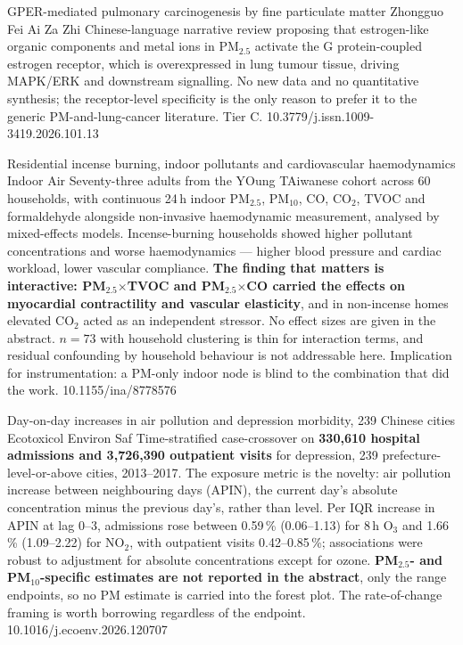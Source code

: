 \documentclass[10pt]{article}
\begin{document}
{GPER-mediated pulmonary carcinogenesis by fine particulate matter}
{Zhongguo Fei Ai Za Zhi}
{Chinese-language narrative review proposing that estrogen-like organic components and
metal ions in PM$_{2.5}$ activate the G protein-coupled estrogen receptor, which is
overexpressed in lung tumour tissue, driving MAPK/ERK and downstream signalling. No new
data and no quantitative synthesis; the receptor-level specificity is the only reason
to prefer it to the generic PM-and-lung-cancer literature. Tier C.}
{10.3779/j.issn.1009-3419.2026.101.13}


{Residential incense burning, indoor pollutants and cardiovascular haemodynamics}
{Indoor Air}
{Seventy-three adults from the YOung TAiwanese cohort across 60 households, with
continuous 24\,h indoor PM$_{2.5}$, PM$_{10}$, CO, CO$_2$, TVOC and formaldehyde
alongside non-invasive haemodynamic measurement, analysed by mixed-effects models.
Incense-burning households showed higher pollutant concentrations and worse
haemodynamics --- higher blood pressure and cardiac workload, lower vascular compliance.
\textbf{The finding that matters is interactive: PM$_{2.5}$$\times$TVOC and
PM$_{2.5}$$\times$CO carried the effects on myocardial contractility and vascular
elasticity}, and in non-incense homes elevated CO$_2$ acted as an independent stressor.
No effect sizes are given in the abstract. $n=73$ with household clustering is thin for
interaction terms, and residual confounding by household behaviour is not addressable
here. Implication for instrumentation: a PM-only indoor node is blind to the
combination that did the work.}
{10.1155/ina/8778576}


{Day-on-day increases in air pollution and depression morbidity, 239 Chinese cities}
{Ecotoxicol Environ Saf}
{Time-stratified case-crossover on \textbf{330,610 hospital admissions and 3,726,390
outpatient visits} for depression, 239 prefecture-level-or-above cities, 2013--2017.
The exposure metric is the novelty: air pollution increase between neighbouring days
(APIN), the current day's absolute concentration minus the previous day's, rather than
level. Per IQR increase in APIN at lag 0--3, admissions rose between 0.59\,\%
(0.06--1.13) for 8\,h O$_3$ and 1.66\,\% (1.09--2.22) for NO$_2$, with outpatient visits
0.42--0.85\,\%; associations were robust to adjustment for absolute concentrations
except for ozone. \textbf{PM$_{2.5}$- and PM$_{10}$-specific estimates are not reported
in the abstract}, only the range endpoints, so no PM estimate is carried into the forest
plot. The rate-of-change framing is worth borrowing regardless of the endpoint.}
{10.1016/j.ecoenv.2026.120707}
\end{document}
